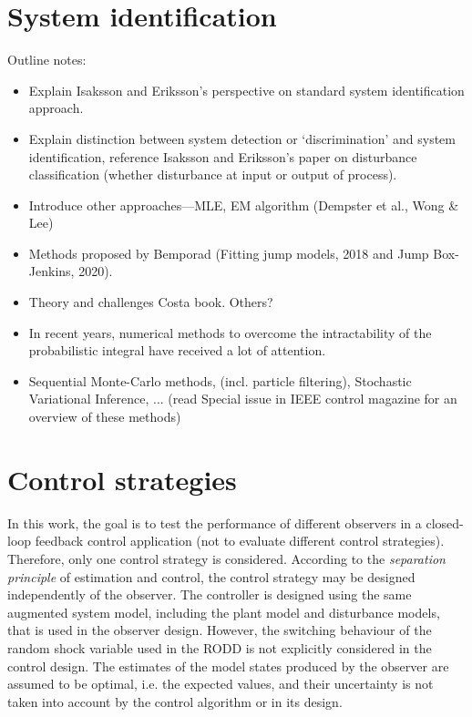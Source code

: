 \section{System identification}

Outline notes:
\begin{itemize}
	\item Explain Isaksson and Eriksson's perspective on standard system identification approach.
	\item Explain distinction between system detection or `discrimination' and system identification, reference Isaksson and Eriksson's paper on disturbance classification (whether disturbance at input or output of process).
	\item Introduce other approaches—MLE, EM algorithm (Dempster et al., Wong \& Lee)
	\item Methods proposed by Bemporad (Fitting jump models, 2018 and Jump Box-Jenkins, 2020).
	\item Theory and challenges Costa book. Others?
	\item In recent years, numerical methods to overcome the intractability of the probabilistic integral have received a lot of attention.
	\item Sequential Monte-Carlo methods, (incl. particle filtering), Stochastic Variational Inference, ... (read Special issue in IEEE control magazine for an overview of these methods)
\end{itemize}


\section{Control strategies}

In this work, the goal is to test the performance of different observers in a closed-loop feedback control application (not to evaluate different control strategies). Therefore, only one control strategy is considered. According to the \textit{separation principle} of estimation and control, the control strategy may be designed independently of the observer. The controller is designed using the same augmented system model, including the plant model and disturbance models, that is used in the observer design. However, the switching behaviour of the random shock variable used in the RODD is not explicitly considered in the control design. The estimates of the model states produced by the observer are assumed to be optimal, i.e. the expected values, and their uncertainty is not taken into account by the control algorithm or in its design.


